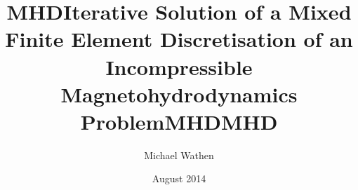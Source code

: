 \documentclass{beamer}
\title{MHD}
\author{Michael Wathen}
\institute{MSc presentation}
\date{August 2014}
\begin{document}
\begin{frame}

\title{Iterative Solution of a Mixed Finite Element Discretisation of
an Incompressible Magnetohydrodynamics Problem}
\titlepage
{}
\title{MHD}
\end{frame}
\title{MHD}






\end{document}
